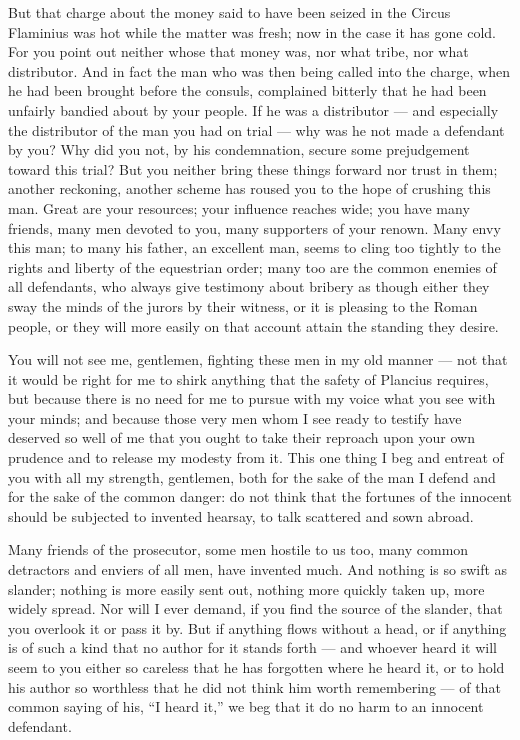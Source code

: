  But that charge about the money said to have been seized in the Circus Flaminius was hot while the matter was fresh; now in the case it has gone cold. For you point out neither whose that money was, nor what tribe, nor what distributor. And in fact the man who was then being called into the charge, when he had been brought before the consuls, complained bitterly that he had been unfairly bandied about by your people. If he was a distributor --- and especially the distributor of the man you had on trial --- why was he not made a defendant by you? Why did you not, by his condemnation, secure some prejudgement toward this trial? But you neither bring these things forward nor trust in them; another reckoning, another scheme has roused you to the hope of crushing this man. Great are your resources; your influence reaches wide; you have many friends, many men devoted to you, many supporters of your renown. Many envy this man; to many his father, an excellent man, seems to cling too tightly to the rights and liberty of the equestrian order; many too are the common enemies of all defendants, who always give testimony about bribery as though either they sway the minds of the jurors by their witness, or it is pleasing to the Roman people, or they will more easily on that account attain the standing they desire.

 You will not see me, gentlemen, fighting these men in my old manner --- not that it would be right for me to shirk anything that the safety of Plancius requires, but because there is no need for me to pursue with my voice what you see with your minds; and because those very men whom I see ready to testify have deserved so well of me that you ought to take their reproach upon your own prudence and to release my modesty from it. This one thing I beg and entreat of you with all my strength, gentlemen, both for the sake of the man I defend and for the sake of the common danger: do not think that the fortunes of the innocent should be subjected to invented hearsay, to talk scattered and sown abroad.

 Many friends of the prosecutor, some men hostile to us too, many common detractors and enviers of all men, have invented much. And nothing is so swift as slander; nothing is more easily sent out, nothing more quickly taken up, more widely spread. Nor will I ever demand, if you find the source of the slander, that you overlook it or pass it by. But if anything flows without a head, or if anything is of such a kind that no author for it stands forth --- and whoever heard it will seem to you either so careless that he has forgotten where he heard it, or to hold his author so worthless that he did not think him worth remembering --- of that common saying of his, ``I heard it,'' we beg that it do no harm to an innocent defendant.

